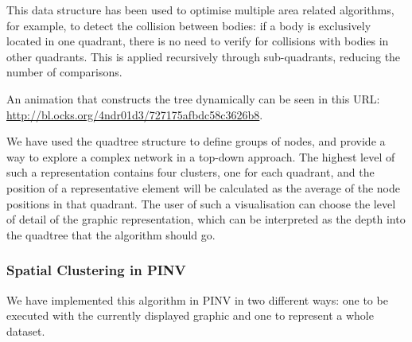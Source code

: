 This data structure has been used to optimise multiple area related algorithms, for example, to detect the collision between bodies: if a body is exclusively located in one quadrant, there is no need to verify for collisions with bodies in other quadrants. This is applied recursively through sub-quadrants, reducing the number of comparisons.

An animation that constructs the tree dynamically can be seen in this URL: \url{http://bl.ocks.org/4ndr01d3/727175afbdc58c3626b8}.

We have used the quadtree structure to define groups of nodes, and provide a way to explore a complex network in a top-down approach. The highest level of such a representation contains four clusters, one for each quadrant, and the position of a representative element will be calculated as the average of the node positions in that quadrant. The user of such a visualisation can choose the level of detail of the graphic representation, which can be interpreted as the depth into the quadtree that the algorithm should go.

\subsubsection{Spatial Clustering in PINV}
We have implemented this algorithm in PINV in two different ways: one to be executed with the currently displayed graphic and one to represent a whole dataset.

